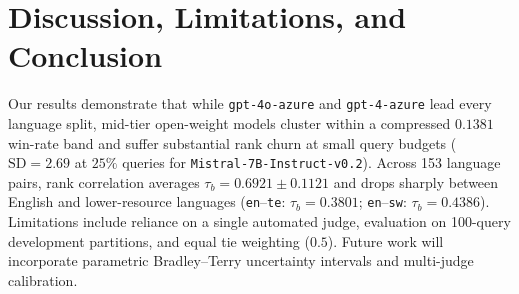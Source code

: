 \documentclass[sigconf]{acmart}
\begin{document}
\section{Discussion, Limitations, and Conclusion}
Our results demonstrate that while \texttt{gpt-4o-azure} and \texttt{gpt-4-azure} lead every language split, mid-tier open-weight models cluster within a compressed $0.1381$ win-rate band and suffer substantial rank churn at small query budgets ($\text{SD} = 2.69$ at $25\%$ queries for \texttt{Mistral-7B-Instruct-v0.2}). Across 153 language pairs, rank correlation averages $\tau_b = 0.6921 \pm 0.1121$ and drops sharply between English and lower-resource languages (\texttt{en}--\texttt{te}: $\tau_b = 0.3801$; \texttt{en}--\texttt{sw}: $\tau_b = 0.4386$). Limitations include reliance on a single automated judge, evaluation on 100-query development partitions, and equal tie weighting ($0.5$). Future work will incorporate parametric Bradley--Terry uncertainty intervals and multi-judge calibration.



\end{document}
